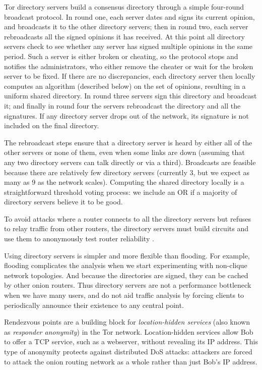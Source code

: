\documentclass[times,10pt,twocolumn]{article}
\begin{document}
Tor directory servers build a consensus directory through a simple
four-round broadcast protocol.  In round one, each server dates and
signs its current opinion, and broadcasts it to the other directory
servers; then in round two, each server rebroadcasts all the signed
opinions it has received.  At this point all directory servers check
to see whether any server has signed multiple opinions in the same
period. Such a server is either broken or cheating, so the protocol
stops and notifies the administrators, who either remove the cheater
or wait for the broken server to be fixed.  If there are no
discrepancies, each directory server then locally computes an algorithm
(described below)
on the set of opinions, resulting in a uniform shared directory. In
round three servers sign this directory and broadcast it; and finally
in round four the servers rebroadcast the directory and all the
signatures.  If any directory server drops out of the network, its
signature is not included on the final directory.

The rebroadcast steps ensure that a directory server is heard by
either all of the other servers or none of them, even when some links
are down (assuming that any two directory servers can talk directly or
via a third). Broadcasts are feasible because there are relatively few
directory servers (currently 3, but we expect as many as 9 as the network
scales). Computing the shared directory locally is a straightforward
threshold voting process: we include an OR if a majority of directory
servers believe it to be good.

To avoid attacks where a router connects to all the directory servers
but refuses to relay traffic from other routers, the directory servers
must build circuits and use them to anonymously test router reliability
\cite{mix-acc}.

Using directory servers is simpler and more flexible than flooding.
For example, flooding complicates the analysis when we
start experimenting with non-clique network topologies. And because
the directories are signed, they can be cached by other onion routers.
Thus directory servers are not a performance
bottleneck when we have many users, and do not aid traffic analysis by
forcing clients to periodically announce their existence to any
central point.

\label{sec:rendezvous}

Rendezvous points are a building block for \emph{location-hidden
services} (also known as \emph{responder anonymity}) in the Tor
network.  Location-hidden services allow Bob to offer a TCP
service, such as a webserver, without revealing its IP address.
This type of anonymity protects against distributed DoS attacks:
attackers are forced to attack the onion routing network as a whole
rather than just Bob's IP address.
\end{document}
